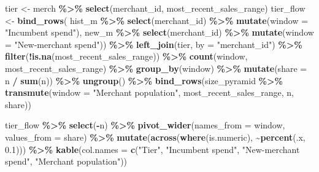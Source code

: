 \documentclass[
]{article}
\newenvironment{Shaded}{\begin{snugshade}}{\end{snugshade}}
\newcommand{\AttributeTok}[1]{\textcolor[rgb]{0.13,0.29,0.53}{#1}}
\newcommand{\FloatTok}[1]{\textcolor[rgb]{0.00,0.00,0.81}{#1}}
\newcommand{\FunctionTok}[1]{\textcolor[rgb]{0.13,0.29,0.53}{\textbf{#1}}}
\newcommand{\NormalTok}[1]{#1}
\newcommand{\OtherTok}[1]{\textcolor[rgb]{0.56,0.35,0.01}{#1}}
\newcommand{\SpecialCharTok}[1]{\textcolor[rgb]{0.81,0.36,0.00}{\textbf{#1}}}
\newcommand{\StringTok}[1]{\textcolor[rgb]{0.31,0.60,0.02}{#1}}
\begin{document}
\begin{Shaded}
\begin{Highlighting}[]
\NormalTok{tier }\OtherTok{\textless{}{-}}\NormalTok{ merch }\SpecialCharTok{\%\textgreater{}\%} \FunctionTok{select}\NormalTok{(merchant\_id, most\_recent\_sales\_range)}
\NormalTok{tier\_flow }\OtherTok{\textless{}{-}} \FunctionTok{bind\_rows}\NormalTok{(}
\NormalTok{  hist\_m }\SpecialCharTok{\%\textgreater{}\%} \FunctionTok{select}\NormalTok{(merchant\_id) }\SpecialCharTok{\%\textgreater{}\%} \FunctionTok{mutate}\NormalTok{(}\AttributeTok{window =} \StringTok{"Incumbent spend"}\NormalTok{),}
\NormalTok{  new\_m   }\SpecialCharTok{\%\textgreater{}\%} \FunctionTok{select}\NormalTok{(merchant\_id) }\SpecialCharTok{\%\textgreater{}\%} \FunctionTok{mutate}\NormalTok{(}\AttributeTok{window =} \StringTok{"New{-}merchant spend"}\NormalTok{)) }\SpecialCharTok{\%\textgreater{}\%}
  \FunctionTok{left\_join}\NormalTok{(tier, }\AttributeTok{by =} \StringTok{"merchant\_id"}\NormalTok{) }\SpecialCharTok{\%\textgreater{}\%}
  \FunctionTok{filter}\NormalTok{(}\SpecialCharTok{!}\FunctionTok{is.na}\NormalTok{(most\_recent\_sales\_range)) }\SpecialCharTok{\%\textgreater{}\%}
  \FunctionTok{count}\NormalTok{(window, most\_recent\_sales\_range) }\SpecialCharTok{\%\textgreater{}\%}
  \FunctionTok{group\_by}\NormalTok{(window) }\SpecialCharTok{\%\textgreater{}\%} \FunctionTok{mutate}\NormalTok{(}\AttributeTok{share =}\NormalTok{ n }\SpecialCharTok{/} \FunctionTok{sum}\NormalTok{(n)) }\SpecialCharTok{\%\textgreater{}\%} \FunctionTok{ungroup}\NormalTok{() }\SpecialCharTok{\%\textgreater{}\%}
  \FunctionTok{bind\_rows}\NormalTok{(size\_pyramid }\SpecialCharTok{\%\textgreater{}\%} \FunctionTok{transmute}\NormalTok{(}\AttributeTok{window =} \StringTok{"Merchant population"}\NormalTok{,}
\NormalTok{                                       most\_recent\_sales\_range, n, share))}

\NormalTok{tier\_flow }\SpecialCharTok{\%\textgreater{}\%} \FunctionTok{select}\NormalTok{(}\SpecialCharTok{{-}}\NormalTok{n) }\SpecialCharTok{\%\textgreater{}\%}
  \FunctionTok{pivot\_wider}\NormalTok{(}\AttributeTok{names\_from =}\NormalTok{ window, }\AttributeTok{values\_from =}\NormalTok{ share) }\SpecialCharTok{\%\textgreater{}\%}
  \FunctionTok{mutate}\NormalTok{(}\FunctionTok{across}\NormalTok{(}\FunctionTok{where}\NormalTok{(is.numeric), }\SpecialCharTok{\textasciitilde{}}\FunctionTok{percent}\NormalTok{(.x, }\FloatTok{0.1}\NormalTok{))) }\SpecialCharTok{\%\textgreater{}\%}
  \FunctionTok{kable}\NormalTok{(}\AttributeTok{col.names =} \FunctionTok{c}\NormalTok{(}\StringTok{"Tier"}\NormalTok{, }\StringTok{"Incumbent spend"}\NormalTok{, }\StringTok{"New{-}merchant spend"}\NormalTok{, }\StringTok{"Merchant population"}\NormalTok{))}
\end{Highlighting}
\end{Shaded}
\end{document}

